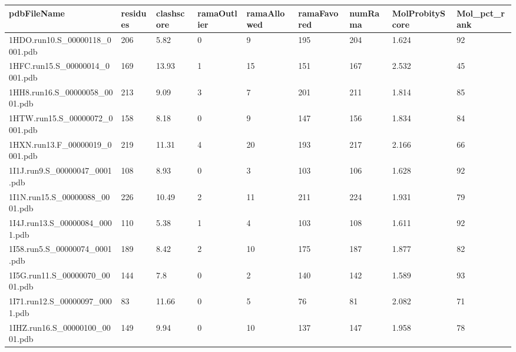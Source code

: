 \documentclass{bioinfo}
\begin{document}
\begin{table*}[!t]
{\begin{tabular}{lllllllll}\toprule
    pdbFileName             & residues & clashscore & ramaOutlier & ramaAllowed & ramaFavored & numRama & MolProbityScore & Mol\_pct\_rank \\ \midrule
    1HDO.run10.S\_00000118\_0001.pdb & 206      & 5.82       & 0           & 9           & 195         & 204     & 1.624           & 92           \\
    1HFC.run15.S\_00000014\_0001.pdb & 169      & 13.93      & 1           & 15          & 151         & 167     & 2.532           & 45           \\
    1HH8.run16.S\_00000058\_0001.pdb & 213      & 9.09       & 3           & 7           & 201         & 211     & 1.814           & 85           \\
    1HTW.run15.S\_00000072\_0001.pdb & 158      & 8.18       & 0           & 9           & 147         & 156     & 1.834           & 84           \\
    1HXN.run13.F\_00000019\_0001.pdb & 219      & 11.31      & 4           & 20          & 193         & 217     & 2.166           & 66           \\
    1I1J.run9.S\_00000047\_0001.pdb & 108      & 8.93       & 0           & 3           & 103         & 106     & 1.628           & 92           \\
    1I1N.run15.S\_00000088\_0001.pdb & 226      & 10.49      & 2           & 11          & 211         & 224     & 1.931           & 79           \\
    1I4J.run13.S\_00000084\_0001.pdb & 110      & 5.38       & 1           & 4           & 103         & 108     & 1.611           & 92           \\
    1I58.run5.S\_00000074\_0001.pdb & 189      & 8.42       & 2           & 10          & 175         & 187     & 1.877           & 82           \\
    1I5G.run11.S\_00000070\_0001.pdb & 144      & 7.8        & 0           & 2           & 140         & 142     & 1.589           & 93           \\
    1I71.run12.S\_00000097\_0001.pdb & 83       & 11.66      & 0           & 5           & 76          & 81      & 2.082           & 71           \\
    1IHZ.run16.S\_00000100\_0001.pdb & 149      & 9.94       & 0           & 10          & 137         & 147     & 1.958           & 78           \\

\end{tabular}}
\end{table*}
\end{document}
